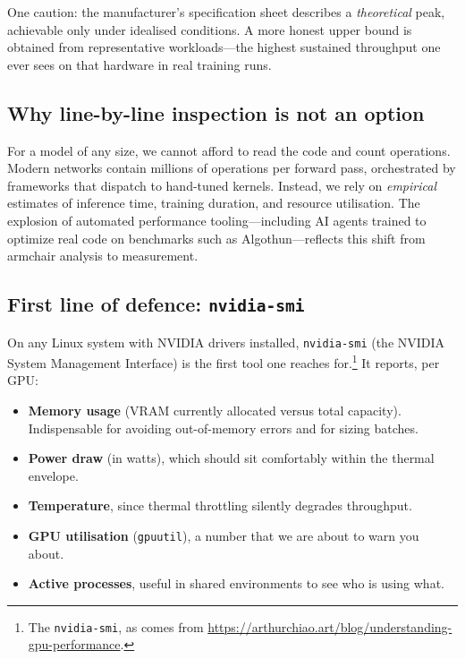 \documentclass[11pt,a4paper]{article}
\theoremstyle{definition}
\theoremstyle{remark}
\theoremstyle{plain}
\begin{document}
One caution: the manufacturer's specification sheet describes a
\emph{theoretical} peak, achievable only under idealised conditions. A
more honest upper bound is obtained from representative workloads---the
highest sustained throughput one ever sees on that hardware in real
training runs.

\subsection{Why line-by-line inspection is not an option}

For a model of any size, we cannot afford to read the code and count
operations. Modern networks contain millions of operations per forward
pass, orchestrated by frameworks that dispatch to hand-tuned kernels.
Instead, we rely on \emph{empirical} estimates of inference time,
training duration, and resource utilisation. The explosion of automated
performance tooling---including AI agents trained to optimize real code
on benchmarks such as Algothun---reflects this shift from armchair
analysis to measurement.

\subsection{First line of defence: \texttt{nvidia-smi}}

On any Linux system with NVIDIA drivers installed, \texttt{nvidia-smi}
(the NVIDIA System Management Interface) is the first tool one reaches
for.\footnote{The \texttt{nvidia-smi}, as comes from
\url{https://arthurchiao.art/blog/understanding-gpu-performance}.} It
reports, per GPU:

\begin{itemize}[leftmargin=1.5em, itemsep=2pt]
    \item \textbf{Memory usage} (VRAM currently allocated versus total
          capacity). Indispensable for avoiding out-of-memory errors and
          for sizing batches.
    \item \textbf{Power draw} (in watts), which should sit comfortably
          within the thermal envelope.
    \item \textbf{Temperature}, since thermal throttling silently
          degrades throughput.
    \item \textbf{GPU utilisation} (\texttt{gpuutil}), a number that we
          are about to warn you about.
    \item \textbf{Active processes}, useful in shared environments to see
          who is using what.
\end{itemize}
\end{document}
